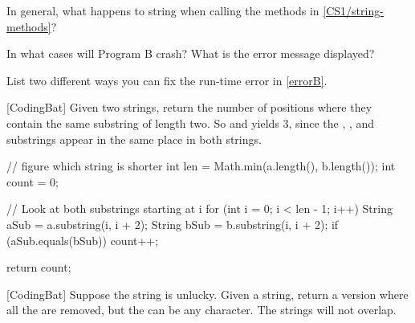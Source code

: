 \Q In general, what happens to  string when calling the methods in \ref{CS1/string-methods}?

\begin{answer}
\end{answer}


\Q \label{errorB} In what cases will Program B crash? What is the error message displayed?

\begin{answer}
\end{answer}


\Q List two different ways you can fix the run-time error in \ref{errorB}.

\begin{answer}[3em]
\end{answer}




\newpage

[CodingBat] Given two strings, return the number of positions where they contain the same substring of length two. So  and  yields 3, since the , , and  substrings appear in the same place in both strings.

\medskip
\begin{javalst}
public int stringMatch(String a, String b) {
\end{javalst}

\vspace{-1em}
\begin{answer}[18em]
\begin{javaans}
    // figure which string is shorter
    int len = Math.min(a.length(), b.length());
    int count = 0;

    // Look at both substrings starting at i
    for (int i = 0; i < len - 1; i++) {
        String aSub = a.substring(i, i + 2);
        String bSub = b.substring(i, i + 2);
        if (aSub.equals(bSub)) {
            count++;
        }
    }

    return count;
\end{javaans}
\end{answer}

\begin{javalst}
}
\end{javalst}

\vfill

[CodingBat] Suppose the string  is unlucky. Given a string, return a version where all the  are removed, but the  can be any character. The  strings will not overlap.


